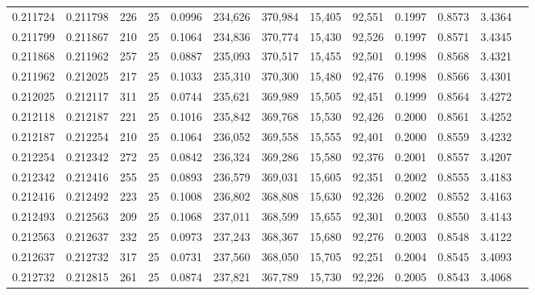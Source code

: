 \begin{tabular}{rrrrrrrrrrrrr}
0.211724 & 0.211798 &   226 &  25 &                                     0.0996 & 234,626 & 370,984 &  15,405 &  92,551 & 0.1997 & 0.8573 & 3.4364 \\
0.211799 & 0.211867 &   210 &  25 &                                     0.1064 & 234,836 & 370,774 &  15,430 &  92,526 & 0.1997 & 0.8571 & 3.4345 \\
0.211868 & 0.211962 &   257 &  25 &                                     0.0887 & 235,093 & 370,517 &  15,455 &  92,501 & 0.1998 & 0.8568 & 3.4321 \\
0.211962 & 0.212025 &   217 &  25 &                                     0.1033 & 235,310 & 370,300 &  15,480 &  92,476 & 0.1998 & 0.8566 & 3.4301 \\
0.212025 & 0.212117 &   311 &  25 &                                     0.0744 & 235,621 & 369,989 &  15,505 &  92,451 & 0.1999 & 0.8564 & 3.4272 \\
0.212118 & 0.212187 &   221 &  25 &                                     0.1016 & 235,842 & 369,768 &  15,530 &  92,426 & 0.2000 & 0.8561 & 3.4252 \\
0.212187 & 0.212254 &   210 &  25 &                                     0.1064 & 236,052 & 369,558 &  15,555 &  92,401 & 0.2000 & 0.8559 & 3.4232 \\
0.212254 & 0.212342 &   272 &  25 &                                     0.0842 & 236,324 & 369,286 &  15,580 &  92,376 & 0.2001 & 0.8557 & 3.4207 \\
0.212342 & 0.212416 &   255 &  25 &                                     0.0893 & 236,579 & 369,031 &  15,605 &  92,351 & 0.2002 & 0.8555 & 3.4183 \\
0.212416 & 0.212492 &   223 &  25 &                                     0.1008 & 236,802 & 368,808 &  15,630 &  92,326 & 0.2002 & 0.8552 & 3.4163 \\
0.212493 & 0.212563 &   209 &  25 &                                     0.1068 & 237,011 & 368,599 &  15,655 &  92,301 & 0.2003 & 0.8550 & 3.4143 \\
0.212563 & 0.212637 &   232 &  25 &                                     0.0973 & 237,243 & 368,367 &  15,680 &  92,276 & 0.2003 & 0.8548 & 3.4122 \\
0.212637 & 0.212732 &   317 &  25 &                                     0.0731 & 237,560 & 368,050 &  15,705 &  92,251 & 0.2004 & 0.8545 & 3.4093 \\
0.212732 & 0.212815 &   261 &  25 &                                     0.0874 & 237,821 & 367,789 &  15,730 &  92,226 & 0.2005 & 0.8543 & 3.4068 \\

\end{tabular}
